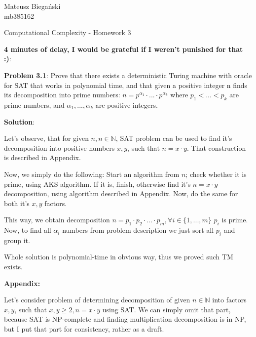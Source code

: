 \documentclass[12pt]{article}
\begin{document}

\begin{flushright}
    Mateusz Biegański \\ 
    mb385162
\end{flushright}

\begin{center}
    \Large Computational Complexity - Homework 3 \normalsize
\end{center}


\textbf{4 minutes of delay, I would be grateful if I weren't punished for that :)}:

\textbf{Problem 3.1}:
Prove that there exists a deterministic Turing machine with oracle for
SAT that works in polynomial time, and that given a positive integer n finds its decomposition into prime numbers:
$n = p^{\alpha_1} \cdot...\cdot p^{\alpha_k} $ where $p_1 < ... < p_k$ are prime numbers, and $\alpha_1,...,\alpha_k$ are positive integers.


{\bf Solution}:

Let's observe, that for given $n, n\in \mathbb{N}$, SAT problem can be used to find it's decomposition into positive numbers $x, y$, such that $n = x \cdot y$. That construction is described in Appendix.

Now, we simply do the following: 
Start an algorithm from $n$; check whether it is prime, using AKS algorithm. If it is, finish, otherwise find it's $n = x\cdot y$ decomposition, using algorithm described in Appendix. Now, do the same for both it's $x, y$ factors.

This way, we obtain decomposition $n = p_1 \cdot p_2 \cdot ... \cdot p_m, \forall{i \in \{1, ..., m\} }$ $p_i$ is prime. Now, to find all $\alpha_i$ numbers from problem description we just sort all $p_i$ and group it.

Whole solution is polynomial-time in obvious way, thus we proved such TM exists.


\textbf{Appendix:}

Let's consider problem of determining decomposition of given $n \in \mathbb{N}$ into factors $x,y$, such that $x, y \geq 2, n = x \cdot y$ using SAT. We can simply omit that part, because SAT is NP-complete and finding multiplication decomposition is in NP, but I put that part for consistency, rather as a draft.
\end{document}
